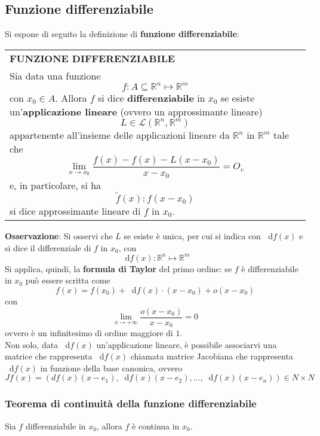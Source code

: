 \documentclass[a4paper]{extarticle}
\renewcommand\arraystretch{}
\newcommand*\dif{\mathop{}\!\mathrm{d}}
\begin{document}
\vspace{1em}
\noindent
\subsection{Funzione differenziabile}
Si espone di seguito la definizione di \textbf{funzione differenziabile}:

\vspace{1em}
\setlength{\tabcolsep}{14pt}
\renewcommand{\arraystretch}{2}
\noindent
\begin{tabularx}{\textwidth}{@{}|P|@{}}
    \hline
    {\textbf{FUNZIONE DIFFERENZIABILE}}\\
    \parbox{\linewidth}{Sia data una funzione
    \[f : A \subseteq \mathbb{R}^n \longmapsto \mathbb{R}^m\]
    con $x_0 \in A$. Allora $f$ si dice \textbf{differenziabile} in $x_0$ se esiste un'\textbf{applicazione lineare} (ovvero un approssimante lineare)
    \[L \in \mathcal{L}(\mathbb{R}^n, \mathbb{R}^m)\]
    appartenente all'insieme delle applicazioni lineare da $\mathbb{R}^n$ in $\mathbb{R}^m$ tale che
    \[\lim_{x \to x_0} \dfrac{f(x) - f(x) - L(x-x_0)}{x-x_0}=O_v\]
    e, in particolare, si ha
    \[\widetilde{f}(x) : f(x-x_0)\]
    si dice approssimante lineare di $f$ in $x_0$.
    \vspace{3mm}}\\
    \hline
\end{tabularx}


\vspace{2em}
\noindent
\textbf{Osservazione}: Si osservi che $L$ se esiste è unica, per cui si indica con $\dif f(x)$ e si dice il differenziale di $f$ in $x_0$, con
\[\boxed{\dif f(x) : \mathbb{R}^n \longmapsto \mathbb{R}^m}\]
Si applica, quindi, la \textbf{formula di Taylor} del primo ordine: se $f$ è differenziabile in $x_0$ può essere scritta come
\[f(x) = f(x_0) + \dif f(x) \cdot (x-x_0) + o(x-x_0)\]
con
\[\lim_{x \to +\infty} \frac{o(x-x_0)}{x-x_0}=0\]
ovvero è un infinitesimo di ordine maggiore di $1$.\\
Non solo, data $\dif f(x)$ un'applicazione lineare, è possibile associarvi una matrice che rappresenta $\dif f(x)$ chiamata matrice Jacobiana che rappresenta $\dif f(x)$ in funzione della base canonica, ovvero
\[J f(x) = \left(df(x)(x-e_1),\dif f(x) (x-e_2), ..., \dif f(x) (x-e_n)\right) \in N \times N\]

\vspace{2em}
\noindent
\subsubsection{Teorema di continuità della funzione differenziabile}
Sia $f$ differenziabile in $x_0$, allora $f$ è continua in $x_0$.
\end{document}
